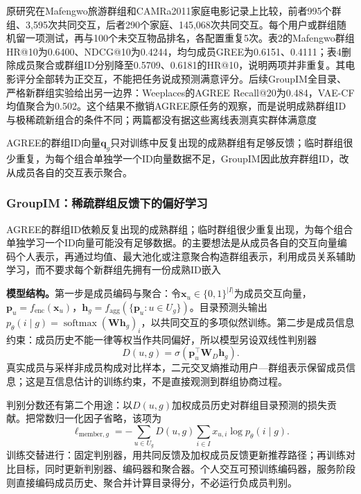 原研究在Mafengwo旅游群组和CAMRa2011家庭电影记录上比较，前者995个群组、3,595次共同交互，后者290个家庭、145,068次共同交互。每个用户或群组随机留一项测试，再与100个未交互物品排名，各配置重复5次。表2的Mafengwo群组HR@10为0.6400、NDCG@10为0.4244，均匀成员GREE为0.6151、0.4111；表4删除成员聚合或群组ID分别降至0.5709、0.6181的HR@10，说明两项并非重复。其电影评分全部转为正交互，不能把任务说成预测满意评分。后续GroupIM全目录、严格新群组实验给出另一边界：Weeplaces的AGREE Recall@20为0.484，VAE-CF均值聚合为0.502。这个结果不撤销AGREE原任务的观察，而是说明成熟群组ID与极稀疏新组合的条件不同；两篇都没有据这些离线表测真实群体满意度

AGREE的群组ID向量$\bm{q}_g$只对训练中反复出现的成熟群组有足够反馈；临时群组很少重复，为每个组合单独学一个ID向量数据不足，GroupIM因此放弃群组ID，改从成员各自的交互表示聚合。
\subsubsection{GroupIM：稀疏群组反馈下的偏好学习}
\label{sec:rs-groupim}

AGREE的群组ID依赖反复出现的成熟群组；临时群组很少重复出现，为每个组合单独学习一个ID向量可能没有足够数据。的主要想法是从成员各自的交互向量编码个人表示，再通过均值、最大池化或注意聚合构造群组表示，利用成员关系辅助学习，而不要求每个新群组先拥有一份成熟ID嵌入

\textbf{模型结构。}第一步是成员编码与聚合：令$\bm{x}_u\in\{0,1\}^{|I|}$为成员交互向量，$\bm{p}_u=f_{\mathrm{enc}}(\bm{x}_u)$，$\bm{h}_g=f_{\mathrm{agg}}(\{\bm{p}_u:u\in U_g\})$。目录预测头输出$p_\theta(i\mid g)=\operatorname{softmax}(\bm{W}\bm{h}_g)_i$，以共同交互的多项似然训练。第二步是成员信息约束：成员历史不能一律等权当作共同偏好，所以模型另设双线性判别器
\begin{equation}
  D(u,g)=\sigma(\bm{p}_u^\top\bm{W}_{D}\bm{h}_g).
  \label{eq:rs-groupim-discriminator}
\end{equation}
真实成员与采样非成员构成对比样本，二元交叉熵推动用户—群组表示保留成员信息；这是互信息估计的训练约束，不是直接观测到群组协商过程。

判别分数还有第二个用途：以$D(u,g)$加权成员历史对群组目录预测的损失贡献。把常数归一化因子省略，该项为
\[
  \ell_{\mathrm{member},g}
    =-\sum_{u\in U_g}D(u,g)\sum_{i\in I}x_{u,i}\log p_\theta(i\mid g).
\]
训练交替进行：固定判别器，用共同反馈及加权成员反馈更新推荐路径；再训练对比目标，同时更新判别器、编码器和聚合器。个人交互可预训练编码器，服务阶段则直接编码成员历史、聚合并计算目录得分，不必运行负成员判别。

